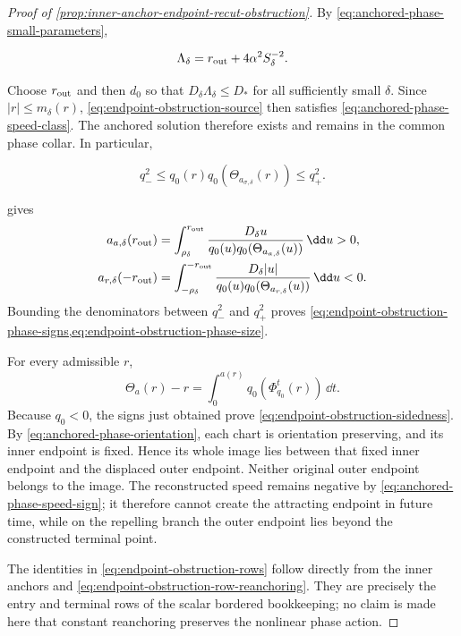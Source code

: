 \begin{proof}[Proof of
\cref{prop:inner-anchor-endpoint-recut-obstruction}]
By \cref{eq:anchored-phase-small-parameters},

\[
 \Lambda_\delta=r_{\rm out}+4\alpha^2S_\delta^{-2}.
\]

Choose \(r_{\rm out}\) and then \(d_0\) so that
\(D_\delta\Lambda_\delta\le D_*\) for all sufficiently small
\(\delta\).  Since \(|r|\le m_\delta(r)\),
\cref{eq:endpoint-obstruction-source} then satisfies
\cref{eq:anchored-phase-speed-class}.  The anchored solution therefore
exists and remains in the common phase collar.  In particular,

\[
 q_-^2
 \le q_0(r)q_0(\Theta_{a_{\sigma,\delta}}(r))
 \le q_+^2.
\]

 gives
\begin{align}
 a_{a,\delta}(r_{\rm out})
 &=\int_{\rho_\delta}^{r_{\rm out}}
   \frac{D_\delta u}
   {q_0(u)q_0(\Theta_{a_{a,\delta}}(u))}\,\dd u>0,
                                                        \label{eq:proof-endpoint-obstruction-attracting-integral}\\
 a_{r,\delta}(-r_{\rm out})
 &=\int_{-\rho_\delta}^{-r_{\rm out}}
   \frac{D_\delta|u|}
   {q_0(u)q_0(\Theta_{a_{r,\delta}}(u))}\,\dd u<0.
                                                        \label{eq:proof-endpoint-obstruction-repelling-integral}
\end{align}
Bounding the denominators between \(q_-^2\) and \(q_+^2\) proves
\cref{eq:endpoint-obstruction-phase-signs,eq:endpoint-obstruction-phase-size}.

For every admissible \(r\),
\begin{equation}
 \Theta_a(r)-r
 =\int_0^{a(r)}q_0(\Phi_{q_0}^t(r))\,\dd t.       \label{eq:proof-endpoint-obstruction-flow-displacement}
\end{equation}
Because \(q_0<0\), the signs just obtained prove
\cref{eq:endpoint-obstruction-sidedness}.  By
\cref{eq:anchored-phase-orientation}, each chart is orientation preserving,
and its inner endpoint is fixed.  Hence its whole image lies between that
fixed inner endpoint and the displaced outer endpoint.  Neither original
outer endpoint belongs to the image.  The reconstructed speed remains
negative by \cref{eq:anchored-phase-speed-sign}; it therefore cannot create
the attracting endpoint in future time, while on the repelling branch the
outer endpoint lies beyond the constructed terminal point.

The identities in
\cref{eq:endpoint-obstruction-rows} follow directly from the inner anchors
and \cref{eq:endpoint-obstruction-row-reanchoring}.  They are precisely the
entry and terminal rows of the scalar bordered bookkeeping; no claim is
made here that constant reanchoring preserves the nonlinear phase action.


\end{proof}
